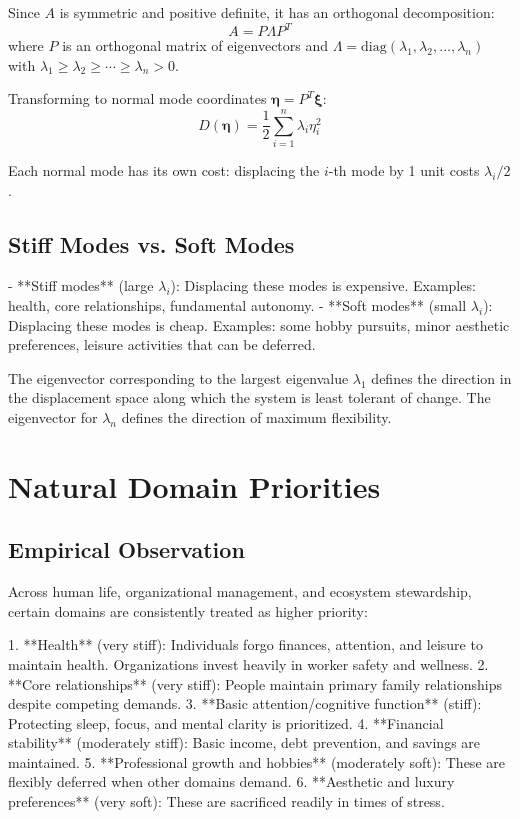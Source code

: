 \documentclass[12pt]{article}
\begin{document}
Since $A$ is symmetric and positive definite, it has an orthogonal decomposition:
\begin{equation}
A = P \Lambda P^T
\end{equation}
where $P$ is an orthogonal matrix of eigenvectors and $\Lambda = \text{diag}(\lambda_1, \lambda_2, \ldots, \lambda_n)$ with $\lambda_1 \geq \lambda_2 \geq \cdots \geq \lambda_n > 0$.

Transforming to normal mode coordinates $\boldsymbol{\eta} = P^T \boldsymbol{\xi}$:
\begin{equation}
D(\boldsymbol{\eta}) = \frac{1}{2} \sum_{i=1}^n \lambda_i \eta_i^2
\end{equation}

Each normal mode has its own cost: displacing the $i$-th mode by 1 unit costs $\lambda_i / 2$.

\subsection{Stiff Modes vs. Soft Modes}

- **Stiff modes** (large $\lambda_i$): Displacing these modes is expensive. Examples: health, core relationships, fundamental autonomy.
- **Soft modes** (small $\lambda_i$): Displacing these modes is cheap. Examples: some hobby pursuits, minor aesthetic preferences, leisure activities that can be deferred.

The eigenvector corresponding to the largest eigenvalue $\lambda_1$ defines the direction in the displacement space along which the system is least tolerant of change. The eigenvector for $\lambda_n$ defines the direction of maximum flexibility.

\section{Natural Domain Priorities}

\subsection{Empirical Observation}

Across human life, organizational management, and ecosystem stewardship, certain domains are consistently treated as higher priority:

1. **Health** (very stiff): Individuals forgo finances, attention, and leisure to maintain health. Organizations invest heavily in worker safety and wellness.
2. **Core relationships** (very stiff): People maintain primary family relationships despite competing demands.
3. **Basic attention/cognitive function** (stiff): Protecting sleep, focus, and mental clarity is prioritized.
4. **Financial stability** (moderately stiff): Basic income, debt prevention, and savings are maintained.
5. **Professional growth and hobbies** (moderately soft): These are flexibly deferred when other domains demand.
6. **Aesthetic and luxury preferences** (very soft): These are sacrificed readily in times of stress.
\end{document}
